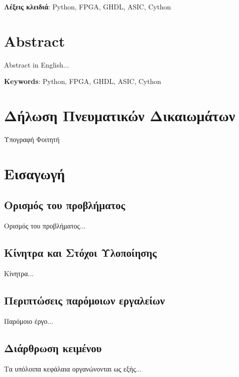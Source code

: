 \documentclass[12pt,a4paper]{report}%
\newcommand\blankpage{%
    \null
    \thispagestyle{empty}%
    \addtocounter{page}{-1}%
    \newpage}
\begin{document}
\vfill
\textbf{Λέξεις κλειδιά}: Python, FPGA, GHDL, ASIC, Cython




\chapter*{Abstract}
Abstract in English...

\vfill
\textbf{Keywords}: Python, FPGA, GHDL, ASIC, Cython

\chapter*{Δήλωση Πνευματικών Δικαιωμάτων}


\vfill
Υπογραφή Φοιτητή


\newpage\tableofcontents

\listoffigures
\clearpage

\listofalgorithms
\clearpage

\listoftables
\clearpage

\lstlistoflistings
\clearpage

\blankpage

\chapter{Εισαγωγή}
\section{Ορισμός του προβλήματος}
Ορισμός του προβλήματος...


\section{Κίνητρα και Στόχοι Υλοποίησης}
Κίνητρα...


\section{Περιπτώσεις παρόμοιων εργαλείων}
Παρόμοιο έργο...

\section{Διάρθρωση κειμένου}
Τα υπόλοιπα κεφάλαια οργανώνονται ως εξής...
\end{document}
